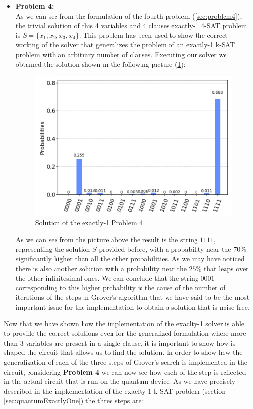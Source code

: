 \documentclass[english]{article}
\begin{document}
\begin{itemize}
					\item \textbf{Problem 4:} \\
						As we can see from the formulation of the fourth problem (\ref{sec:problem4}), the trivial solution of this 4 variables and 4 clauses exactly-1 4-SAT problem is $S=\{x_1, x_2, x_3, x_4\}$. This problem has been used to show the correct working of the solver that generalizes the problem of an exactly-1 k-SAT problem with an arbitrary number of clauses. Executing our solver we obtained the solution shown in the following picture (\ref{fig:problem4Solution}):
						\begin{figure}[h]
							\centering
							\includegraphics[scale=0.46]{Problem_4_Solution.png}
							\caption{
								\label{fig:problem4Solution}
								Solution of the exactly-1 Problem 4
							}
						\end{figure}
					
						As we can see from the picture above the result is the string $1111$, representing the solution $S$ provided before, with a probability near the $70\%$ significantly higher than all the other probabilities. As we may have noticed there is also another solution with a probability near the $25\%$ that leaps over the other infinitesimal ones. We can conclude that the string $0001$ corresponding to this higher probability is the cause of the number of iterations of the steps in Grover's algorithm that we have said to be the most important issue for the implementation to obtain a solution that is noise free.
				\end{itemize}
				Now that we have shown how the implementation of the exaclty-1 solver is able to provide the correct solutions even for the generalized formulation where more than 3 variables are present in a single clause, it is important to show how is shaped the circuit that allows us to find the solution. In order to show how the generalization of each of the three steps of Grover's search is implemented in the circuit, considering \textbf{Problem 4} we can now see how each of the step is reflected in the actual circuit that is run on the quantum device. As we have precisely described in the impkementation of the exaclty-1 k-SAT problem (section \ref{sec:quantumExactlyOne}) the three steps are:
\end{document}
